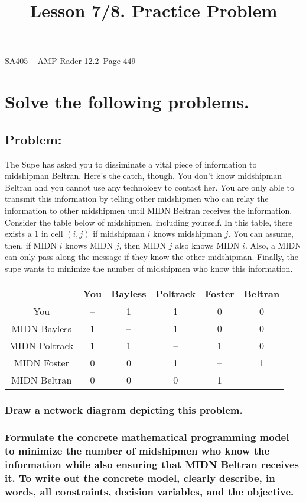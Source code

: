 \documentclass[11pt]{article}
\makeatletter
\theoremstyle{definition}
\renewcommand{\maketitle}{
  \noindent SA405 -- AMP \hfill Rader 12.2--Page 449  \\

  \begin{center}\Large{\textbf{\@title}}\end{center}
}
\makeatother
\begin{document}
  
\title{Lesson 7/8. Practice Problem }

\maketitle


\section{Solve the following problems.}
\subsection{Problem:}

The Supe has asked you to dissiminate a vital piece of information to midshipman Beltran. Here's the catch, though. You don't know midshipman Beltran and you cannot use any technology to contact her. You are only able to transmit this information by telling other midshipmen who can relay the information to other midshipmen until MIDN Beltran receives the information. Consider the table below of midshipmen, including yourself. In this table, there exists a $1$ in cell $(i,j)$ if midshipman $i$ knows midshipman $j$. You can assume, then, if MIDN $i$ knows MIDN $j$, then MIDN $j$ also knows MIDN $i$. Also, a MIDN can only pass along the message if they know the other midshipman. Finally, the supe wants to minimize the number of midshipmen who know this information.

\begin{center}
\begin{tabular}{|c|c|c|c|c|c|}
\hline
 & You &Bayless & Poltrack& Foster&Beltran \\ \hline
You &-- &1 &1 & 0& 0 \\ \hline
MIDN Bayless & 1 &-- &1 &0 & 0 \\ \hline
MIDN Poltrack &1 &1 &-- & 1 & 0 \\ \hline
MIDN Foster& 0&0  &1 &-- &1 \\ \hline
MIDN Beltran & 0 &0 &0 &1 &-- \\ \hline
\end{tabular}
\end{center}
 

\subsubsection{Draw a network diagram depicting this problem.}
\vfill
\subsubsection{Formulate the concrete mathematical programming model to minimize the number of midshipmen who know the information while also ensuring that MIDN Beltran receives it. To write out the concrete model, clearly describe, in words, all constraints, decision variables, and the objective.}
\vfill
\end{document}
